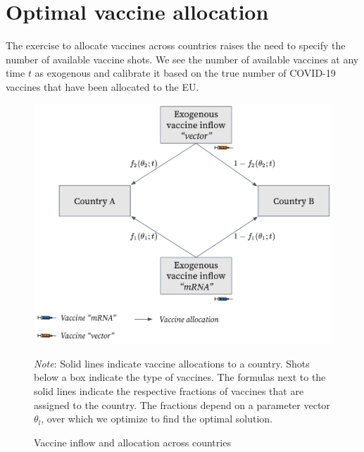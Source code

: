 \section{Optimal vaccine allocation}\label{sec:vaccine_allocation}
The exercise to allocate vaccines across countries raises the need to specify the number of available vaccine shots. We see the number of available vaccines at any time $t$ as exogenous and calibrate it based on the true number of COVID-19 vaccines that have been allocated to the EU.
\begin{figure}[h!]
\centering
\includegraphics[scale=0.3]{images/overview_vaccine_inflow.png}\\
\begin{flushleft}
\scriptsize{\textit{Note}: Solid lines indicate vaccine allocations to a country. Shots below a box indicate the type of vaccines. The formulas next to the solid lines indicate the respective fractions of vaccines that are assigned to the country. The fractions depend on a parameter vector $\theta_l$, over which we optimize to find the optimal solution.}
\end{flushleft}
\caption{Vaccine inflow and allocation across countries}
\label{fig:model_vaccine_allocation}
\end{figure}

